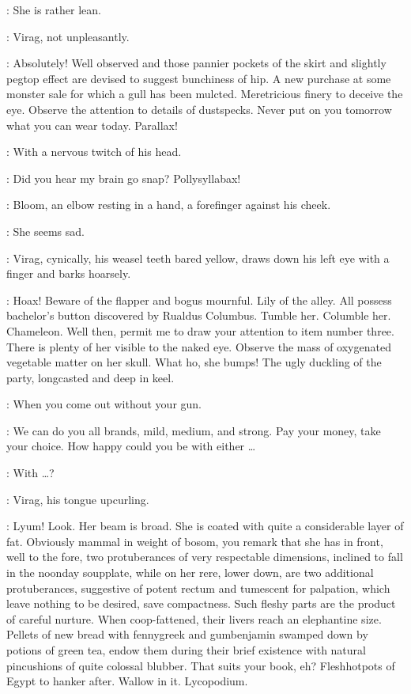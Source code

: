 \Bloom:
She is rather lean.

:
Virag, not unpleasantly.

\Virag:
Absolutely!
Well observed and those pannier pockets of the skirt
and slightly pegtop effect are devised to suggest bunchiness of hip.
A new purchase at some monster sale for which a gull has been mulcted.
Meretricious finery to deceive the eye.
Observe the attention to details of dustspecks.
Never put on you tomorrow what you can wear today.
Parallax!

:
With a nervous twitch of his head.

\Virag:
Did you hear my brain go snap?
Pollysyllabax!

:
Bloom, an elbow resting in a hand, a forefinger against his cheek.

\Bloom:
She seems sad.

:
Virag, cynically, his weasel teeth bared yellow, draws down his left eye
with a finger and barks hoarsely.

\Virag:
Hoax! Beware of the flapper and bogus mournful.
Lily of the alley.
All possess bachelor's button discovered by Rualdus Columbus.
Tumble her. Columble her. Chameleon.
Well then, permit me to draw your attention to item number three.
There is plenty of her visible to the naked eye.
Observe the mass of oxygenated vegetable matter on her skull.
What ho, she bumps!
The ugly duckling of the party, longcasted and deep in keel.

\Bloom:
When you come out without your gun.

\Virag:
We can do you all brands, mild, medium, and strong.
Pay your money, take your choice.
How happy could you be with either \ldots

\Bloom:
With \ldots?

:
Virag, his tongue upcurling.

\Virag:
Lyum! Look.
Her beam is broad.
She is coated with quite a considerable layer of fat.
Obviously mammal in weight of bosom,
you remark that she has in front, well to the fore,
two protuberances of very respectable dimensions,
inclined to fall in the noonday soupplate,
while on her rere, lower down, are two additional protuberances,
suggestive of potent rectum and tumescent for palpation,
which leave nothing to be desired, save compactness.
Such fleshy parts are the product of careful nurture.
When coop-fattened, their livers reach an elephantine size.
Pellets of new bread with fennygreek and gumbenjamin
swamped down by potions of green tea,
endow them during their brief existence
with natural pincushions of quite colossal blubber.
That suits your book, eh?
Fleshhotpots of Egypt to hanker after.
Wallow in it.
Lycopodium.

